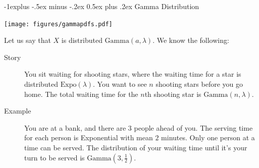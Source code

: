 \documentclass[10pt,landscape]{article}
\makeatletter
\newcommand\independent{\protect\mathpalette{\protect\independenT}{\perp}}
\def\independenT#1#2{\mathrel{\setbox0\hbox{$#1#2$}%
    \copy0\kern-\wd0\mkern4mu\box0}}
\newcommand{\Beta}{\textrm{Beta}}
\newcommand{\Gam}{\textrm{Gamma}}
\newcommand{\Expo}{\textrm{Expo}}
\renewcommand{\subsection}{\@startsection{subsection}{2}{0mm}%
                                {-1explus -.5ex minus -.2ex}%
                                {0.5ex plus .2ex}%
                                {\normalfont\normalsize\bfseries}}
\makeatother
\begin{document}
\begin{multicols*}{3}
\subsection{Gamma Distribution}
\begin{minipage}{\linewidth}
            \centering
\texttt{[image: figures/gammapdfs.pdf]}
        \end{minipage}
\medskip
Let us say that $X$ is distributed $\Gam(a, \lambda)$. We know the following:
\begin{description}
    \item[Story] You sit waiting for shooting stars, where the waiting time for a star is distributed $\Expo(\lambda)$. You want to see $n$ shooting stars before you go home. The total waiting time for the $n$th shooting star is $\Gam(n,\lambda)$.
    \item[Example]  You are at a bank, and there are 3 people ahead of you. The serving time for each person is Exponential with mean $2$ minutes. Only one person at a time can be served. The distribution of your waiting time until it's your turn to be served is $\Gam(3, \frac{1}{2})$.

\end{description}







\end{multicols*}
\end{document}
